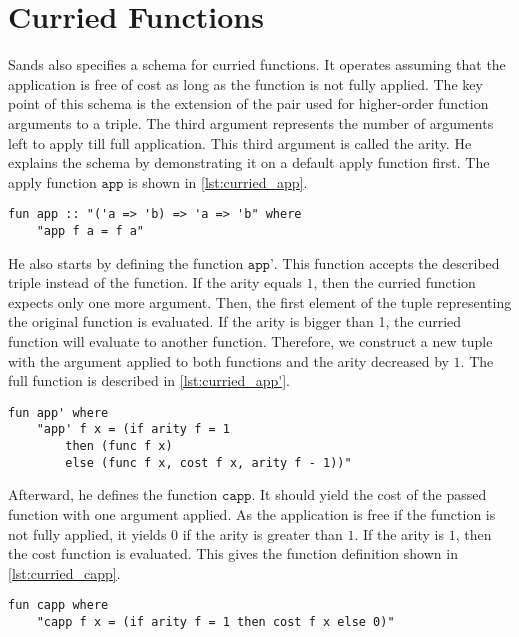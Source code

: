 
\section{Curried Functions} \label{chapter:rel_curried}

Sands also specifies a schema for curried functions.
It operates assuming that the application is free of cost as long as the function is not fully applied.
The key point of this schema is the extension of the pair used for higher-order function arguments to a triple.
The third argument represents the number of arguments left to apply till full application.
This third argument is called the arity.
He explains the schema by demonstrating it on a default apply function first.
The apply function $\texttt{app}$ is shown in \autoref{lst:curried_app}.
\begin{lstlisting}[language=isabelle,mathescape=true,caption=Apply function,label=lst:curried_app]
  fun app :: "('a => 'b) => 'a => 'b" where
    "app f a = f a"
\end{lstlisting}

He also starts by defining the function $\texttt{app'}$.
This function accepts the described triple instead of the function.
If the arity equals $1$, then the curried function expects only one more argument.
Then, the first element of the tuple representing the original function is evaluated.
If the arity is bigger than 1, the curried function will evaluate to another function.
Therefore, we construct a new tuple with the argument applied to both functions and the arity decreased by $1$.
The full function is described in \autoref{lst:curried_app'}.
\begin{lstlisting}[language=isabelle,mathescape=true,label=lst:curried_app',caption=Apply function on function argument triple]
  fun app' where
    "app' f x = (if arity f = 1
        then (func f x)
        else (func f x, cost f x, arity f - 1))"
\end{lstlisting}

Afterward, he defines the function $\texttt{capp}$.
It should yield the cost of the passed function with one argument applied.
As the application is free if the function is not fully applied, it yields $0$ if the arity is greater than $1$.
If the arity is $1$, then the cost function is evaluated.
This gives the function definition shown in \autoref{lst:curried_capp}.
\begin{lstlisting}[language=isabelle,mathescape=true,caption=Timing function of apply function,label=lst:curried_capp]
  fun capp where
    "capp f x = (if arity f = 1 then cost f x else 0)"
\end{lstlisting}

